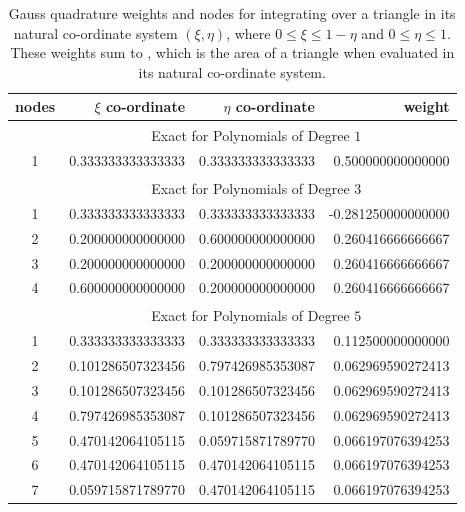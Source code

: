 \begin{table}
    \centering
    \begin{tabular}{|c|rrr|}
        \hline
        nodes & \centering $\xi$ co-ordinate \phantom{123} & 
        \centering $\eta$ co-ordinate \phantom{123} &
        weight \phantom{123456} \\ \hline
        & \multicolumn{3}{|c|}{Exact for Polynomials of Degree $1^{\phantom{|^|}}$} \\ 
        \hline
        1 & 0.333333333333333 & 0.333333333333333 & 0.500000000000000 \\ 
        \hline
        & \multicolumn{3}{|c|}{Exact for Polynomials of Degree $3^{\phantom{|^|}}$} \\ \hline
        1 & 0.333333333333333 & 0.333333333333333 & -0.281250000000000 \\
        2 & 0.200000000000000 & 0.600000000000000 & 0.260416666666667 \\ 
        3 & 0.200000000000000 & 0.200000000000000 & 0.260416666666667 \\
        4 & 0.600000000000000 & 0.200000000000000 & 0.260416666666667 \\ 
        \hline
        & \multicolumn{3}{|c|}{Exact for Polynomials of Degree $5^{\phantom{|^|}}$} \\ \hline
        1 & 0.333333333333333 & 0.333333333333333 & 0.112500000000000 \\
        2 & 0.101286507323456 & 0.797426985353087 & 0.062969590272413 \\ 
        3 & 0.101286507323456 & 0.101286507323456 & 0.062969590272413 \\
        4 & 0.797426985353087 & 0.101286507323456 & 0.062969590272413 \\
        5 & 0.470142064105115 & 0.059715871789770 & 0.066197076394253 \\ 
        6 & 0.470142064105115 & 0.470142064105115 & 0.066197076394253 \\
        7 & 0.059715871789770 & 0.470142064105115 & 0.066197076394253 \\
        \hline
    \end{tabular}
    \caption{Gauss quadrature weights and nodes for integrating over a triangle in its natural co-ordinate system $( \xi , \eta )$, where $0 \leq \xi \leq 1 - \eta$ and $0 \leq \eta \leq 1$.  These weights sum to , which is the area of a triangle when evaluated in its natural co-ordinate system.}
    \label{tabQuadrature2D}
\end{table}


